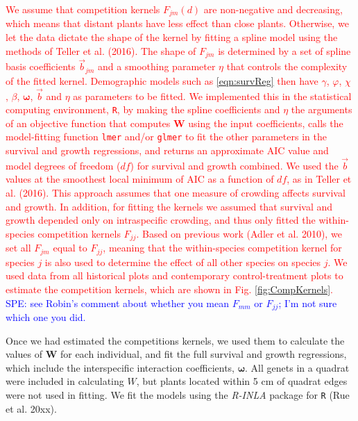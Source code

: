 \documentclass[11pt]{article}
\newcommand{\new}{\textcolor{red}}
\newcommand{\comment}{\textcolor{blue}}
\begin{document}
\begin{doublespacing}
\new{We assume that competition kernels $F_{jm}(d)$ are non-negative and decreasing, which means that distant plants have less effect 
than close plants. Otherwise, we let the data dictate the shape of the kernel by fitting a spline model 
using the methods of Teller et al. (2016). The shape of $F_{jm}$ is determined by a set of spline basis coefficients $\vec{b}_{jm}$
and a smoothing parameter $\eta$ that controls the complexity of the fitted kernel. 
Demographic models such as \eqref{eqn:survReg} then have $\gamma$, $\varphi$, $\chi$ , 
$\beta$, $\boldsymbol{\omega}$, $\vec{b}$ and $\eta$ as parameters to be fitted. We implemented this in the statistical computing environment, \texttt{R}, 
by making the spline coefficients and $\eta$ the arguments of an objective function that computes $\boldsymbol{W}$ using the input coefficients, 
calls the model-fitting function \texttt{lmer} and/or \texttt{glmer} to fit the other parameters in the survival and growth regressions, and returns an approximate AIC value and model degrees of freedom ($df$) for survival and growth combined. We used the $\vec{b}$ values at the smoothest 
local minimum of AIC as a function of $df$, as in Teller et al. (2016). This approach assumes that one measure of crowding affects 
survival and growth. In addition, 
for fitting the kernels we assumed that survival and growth depended only on intraspecific crowding, and thus only fitted the
within-species competition kernels $F_{jj}$. Based on previous work (Adler et al. 2010), we set all $F_{jm}$ equal to $F_{jj}$, meaning that 
the within-species competition kernel for species $j$ is also used to determine the effect of all other species on species $j$. We used data from all historical plots and contemporary control-treatment plots to estimate the competition kernels, which are shown in Fig. \ref{fig:CompKernels}. }
\comment{SPE: see Robin's comment about whether you mean $F_{mm}$ or $F_{jj}$; I'm not sure which one you did.}

Once we had estimated the competitions kernels, we used them to calculate the values of $\boldsymbol{W}$ for each individual, 
and fit the full survival and growth regressions, which include the interspecific interaction coefficients, $\boldsymbol{\omega}$. 
All genets in a quadrat were included in calculating $W$, but plants located within 5 cm of quadrat edges were not used in fitting. 
We fit the models using the \textit{R-INLA} package for \texttt{R} (Rue et al. 20xx). 


\end{doublespacing}
\end{document}
